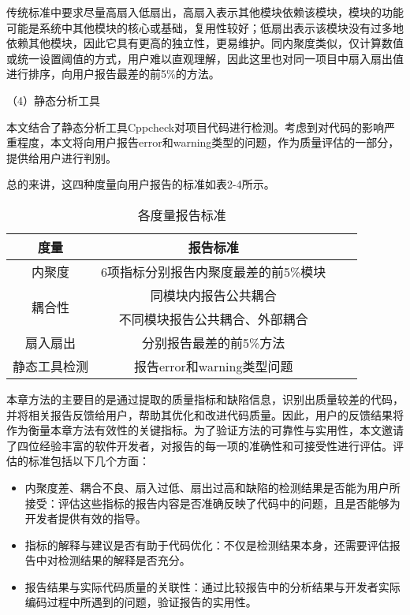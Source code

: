 传统标准中要求尽量高扇入低扇出，高扇入表示其他模块依赖该模块，模块的功能可能是系统中其他模块的核心或基础，复用性较好；低扇出表示该模块没有过多地依赖其他模块，因此它具有更高的独立性，更易维护。同内聚度类似，仅计算数值或统一设置阈值的方式，用户难以直观理解，因此这里也对同一项目中扇入扇出值进行排序，向用户报告最差的前5\%的方法。

（4）静态分析工具

本文结合了静态分析工具Cppcheck对项目代码进行检测。考虑到对代码的影响严重程度，本文将向用户报告error和warning类型的问题，作为质量评估的一部分，提供给用户进行判别。

总的来讲，这四种度量向用户报告的标准如表2-4所示。

\begin{table}[htbp]
\caption{各度量报告标准}
\vspace{0.5em}\centering\wuhao
\begin{tabular}{cccc}
\toprule
度量 & 报告标准 \\
\midrule
内聚度 &  6项指标分别报告内聚度最差的前5\%模块 \\
\multirow{2}{*}{耦合性} &  同模块内报告公共耦合\\
                        & 不同模块报告公共耦合、外部耦合 \\
扇入扇出 & 分别报告最差的前5\%方法 \\
静态工具检测 &  报告error和warning类型问题\\ 
\bottomrule
\end{tabular}
\end{table}

本章方法的主要目的是通过提取的质量指标和缺陷信息，识别出质量较差的代码，并将相关报告反馈给用户，帮助其优化和改进代码质量。因此，用户的反馈结果将作为衡量本章方法有效性的关键指标。为了验证方法的可靠性与实用性，本文邀请了四位经验丰富的软件开发者，对报告的每一项的准确性和可接受性进行评估。评估的标准包括以下几个方面：

\begin{itemize}
    \item 内聚度差、耦合不良、扇入过低、扇出过高和缺陷的检测结果是否能为用户所接受：评估这些指标的报告内容是否准确反映了代码中的问题，且是否能够为开发者提供有效的指导。
    \item 指标的解释与建议是否有助于代码优化：不仅是检测结果本身，还需要评估报告中对检测结果的解释是否充分。
    \item 报告结果与实际代码质量的关联性：通过比较报告中的分析结果与开发者实际编码过程中所遇到的问题，验证报告的实用性。
\end{itemize}

